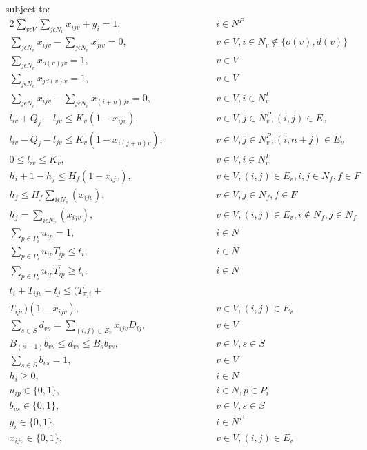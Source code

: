 \documentclass[a4paper,12pt]{article}
\begin{document}
subject to:
\begingroup
    \allowdisplaybreaks
\begin{alignat} {2}
    \sum_{v\epsilon V}\sum_{j\epsilon N_v}x_{ijv} + y_i = 1,&\quad\quad\quad&&i \in N^P \label{eq:2} \\[4]
    \sum_{j\epsilon N_v}x_{ijv} - \sum_{j\epsilon N_v}x_{jiv} = 0,& &&v \in V, i\in N_v \notin \{o(v), d(v)\} \label{eq:3} \\[4]
    \sum_{j\epsilon N_v}x_{o(v)jv} = 1,& &&v \in V \label{eq:4}\\[4]
    \sum_{j\epsilon N_v}x_{j d(v)v} = 1,& &&v \in V \label{eq:5}\\[4]
    \sum_{j\epsilon N_v}x_{ijv} - \sum_{j\epsilon N_v}x_{(i+n)jv} = 0,& &&v \in V, i\in N^P_v \label{eq:6}\\[4]
    l_{iv} + Q_j - l_{jv} \leq K_v(1-x_{ijv}),& &&v \in V,j\in N_v^P,(i,j) \in E_v \label{eq:7} \\[8]
    l_{iv} - Q_j - l_{jv} \leq K_v(1-x_{i(j+n)v}),& &&v \in V,j\in N_v^P, (i, n+j)\in E_v \label{eq:8}\\[8]
    0 \leq l_{iv} \leq K_v,& &&v \in V, i \in N^P_v \label{eq:9}\\[8]
    h_{i} + 1 - h_{j} \leq H_f(1-x_{ijv}),& &&v \in V, (i,j)\in E_v, i, j\in N_f, f\in F\label{eq:10}\\[4]
    h_{j} \leq H_f\sum_{i\epsilon N_v}(x_{ijv}),& &&v\in V, j\in N_f, f\in F\label{eq:11}\\[4]
    h_{j} = \sum_{i\epsilon N_v}(x_{ijv}),& &&v \in V, (i, j)\in E_v, i \notin N_f, j \in N_f\label{eq:12}\\[4]
    \sum_{p\in P_i} u_{ip} = 1,& &&i\in N\label{eq:13}\\[4]
    \sum_{p\in P_i} u_{ip}\underline{T_{ip}} \leq t_{i},& &&i\in N\label{eq:14}\\[4]
    \sum_{p\in P_i} u_{ip}\overline{T_{ip}} \geq t_{i},& &&i\in N\label{eq:15}\\[4]
    t_{i} + T_{ijv} - t_{j} \leq (\overline{T_{\pi_i i}} + & &&\nonumber\\
    T_{ijv})(1 - x_{ijv}),& && v \in V, (i,j) \in E_v\label{eq:16}\\[8]
    \sum_{s \in S}d_{vs} = \sum_{(i,j) \in E_v} x_{ijv}D_{ij},& &&v \in V\label{eq:17}\\[4]
    B_{(s-1)}b_{vs} \leq d_{vs} \leq B_sb_{vs},& &&v \in V, s \in S\label{eq:18}\\[4]
    \sum_{s \in S} b_{vs} = 1,& &&v \in V\label{eq:19}\\[4]
    h_{i} \geq 0,& &&i \in N\label{eq:20}\\[8]
    u_{ip} \in \{0, 1\},& &&i \in N, p \in P_i\label{eq:21}\\[8]
    b_{vs} \in \{0, 1\},& &&v \in V, s \in S\label{eq:22}\\[8]
    y_i \in \{0, 1\},& &&i \in N^P\label{eq:23}\\[8]
    x_{ijv} \in \{0, 1\},& &&v \in V, (i, j) \in E_v\label{eq:24}
\end{alignat}
\end{document}
